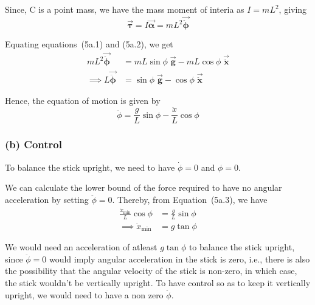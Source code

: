 Since, C is a point mass, we have the mass moment of interia as \( I = mL^2 \), giving
\begin{equation}
    \vec{\boldsymbol{\tau}} = I \vec{\boldsymbol{\alpha}} = mL^2 \vec{\ddot{\boldsymbol{\phi}}}
    \tag{5a.2}
\end{equation}

Equating equations~(5a.1) and (5a.2), we get
\begin{align*}
    mL^2 \vec{\ddot{\boldsymbol{\phi}}}
     & =
    mL\sin\phi \; \vec{\mathbf{g}} - mL\cos\phi \; \vec{\ddot{\mathbf{x}}} \\
    \implies
    L \vec{\ddot{\boldsymbol{\phi}}}
     & =
    \sin\phi \; \vec{\mathbf{g}} - \cos\phi \; \vec{\ddot{\mathbf{x}}}
\end{align*}

Hence, the equation of motion is given by
\begin{equation}
    \boxed{
        \ddot{\phi} = \frac{g}{L} \sin\phi - \frac{\ddot x}{L} \cos\phi
    }
    \tag{5a.3}
\end{equation}

\subsubsection*{(b) Control}

To balance the stick upright, we need to have \( \dot\phi = 0 \) and \( \phi = 0 \).

We can calculate the lower bound of the force required to have no angular acceleration by setting \( \ddot\phi = 0 \).
Thereby, from Equation~(5a.3), we have
\begin{align*}
    \frac{\ddot x_{\min}}{L} \cos\phi
     & =
    \frac{g}{L} \sin\phi
    \\ \implies
    \ddot x_{\min}
     & =
    g \tan\phi
\end{align*}

We would need an acceleration of atleast \( g \tan\phi \) to balance the stick upright, since \( \ddot \phi = 0\) would imply angular acceleration in the stick is zero, i.e., there is also the possibility that the angular velocity of the stick is non-zero, in which case, the stick wouldn't be vertically upright.
To have control so as to keep it vertically upright, we would need to have a non zero \( \ddot\phi \).
